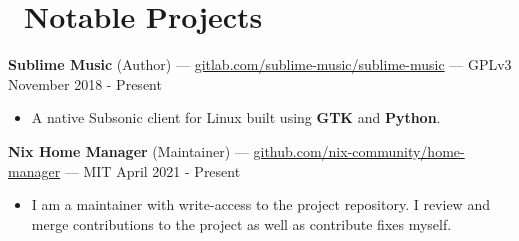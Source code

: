 \documentclass[10pt,letterpaper]{article}
\begin{document}
\section*{\faCode\ Notable Projects}
\textbf{Sublime Music} (Author) ---
\href{https://gitlab.com/sublime-music/sublime-music}{gitlab.com/sublime-music/sublime-music}
--- GPLv3 \hfill November 2018 - Present
\begin{itemize}
    \item A native Subsonic client for Linux built using \textbf{GTK} and
        \textbf{Python}.
\end{itemize}

\textbf{Nix Home Manager} (Maintainer) ---
\href{https://github.com/nix-community/home-manager}{github.com/nix-community/home-manager}
--- MIT \hfill April 2021 - Present
\begin{itemize}
    \item I am a maintainer with write-access to the project repository. I
        review and merge contributions to the project as well as contribute
        fixes myself.

\end{itemize}

\end{document}
